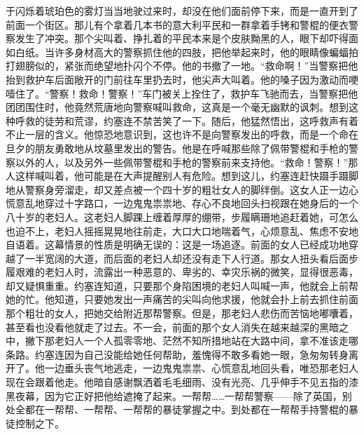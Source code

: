 于闪烁着琥珀色的雾灯当当地驶过来时，却没在他们面前停下来，而是一直开到了前面一个街区。那儿有个拿着几本书的意大利平民和一群拿着手铐和警棍的便衣警察发生了冲突。那个尖叫着、挣扎着的平民本来是个皮肤黝黑的人，眼下却吓得面如白纸。当许多身材高大的警察抓住他的四肢，把他举起来时，他的眼睛像蝙蝠拍打翅膀似的，紧张而绝望地扑闪个不停。他的书撤了一地。“救命啊！”当警察把他抬到救护车后面敞开的门前往车里扔去时，他尖声大叫着。他的嗓子因为激动而哽噎住了。“警察！救命！警察！”车门被关上拴住了，救护车飞驰而去，当警察把他团团围住时，他竟然荒唐地向警察喊叫救命，这真是一个毫无幽默的讽刺。想到这种呼救的徒劳和荒谬，约塞连不禁苦笑了一下。随后，他猛然悟出，这呼救声有着不止一层的含义。他惊恐地意识到，这也许不是向警察发出的呼救，而是一个命在旦夕的朋友勇敢地从坟墓里发出的警告。他是在呼喊那些除了佩带警棍和手枪的警察以外的人，以及另外一些佩带警棍和手枪的警察前来支持他。“救命！警察！”那人这样喊叫着，他可能是在大声提醒别人有危险。想到这儿，约塞连赶快蹑手蹑脚地从警察身旁溜走，却又差点被一个四十岁的粗壮女人的脚绊倒。这女人正一边心慌意乱地穿过十字路口，一边鬼鬼祟祟地、存心不良地回头扫视跟在她身后的一个八十岁的老妇人。这老妇人脚踝上缠着厚厚的绷带，步履瞒珊地追赶着她，可怎么也迫不上，老妇人摇摇晃晃地往前走，大口大口地喘着气，心烦意乱、焦虑不安地自语着。这幕情景的性质是明确无误的：这是一场追逐。前面的女人已经成功地穿越了一半宽阔的大道，而后面的老妇人却还没有走下人行道。那女人扭头看后面步履艰难的老妇人时，流露出一种恶意的、卑劣的、幸灾乐祸的微笑，显得很恶毒，却又疑惧重重。约塞连知道，只要那个身陷困境的老妇人叫喊一声，他就会上前帮她的忙。他知道，只要她发出一声痛苦的尖叫向他求援，他就会扑上前去抓住前面那个粗壮的女人，把她交给附近那帮警察。但是，那老妇人悲伤而苦恼地嘟囔着，甚至看也没看他就走了过去。不一会，前面的那个女人消失在越来越深的黑暗之中，撇下那老妇人一个人孤零零地、茫然不知所措地站在大路中间，拿不准该走哪条路。约塞连因为自己没能给她任何帮助，羞愧得不敢多看她一眼，急匆匆转身离开了。他一边垂头丧气地逃走，一边鬼鬼祟祟、心慌意乱地回头看，唯恐那老妇人现在会跟着他走。他暗自感谢飘洒着毛毛细雨、没有光亮、几乎伸手不见五指的漆黑夜幕，因为它正好把他给遮掩了起来。一帮帮……一帮帮警察——除了英国，别处全都在一帮帮、一帮帮、一帮帮的暴徒掌握之中。到处都在一帮帮手持警棍的暴徒控制之下。

